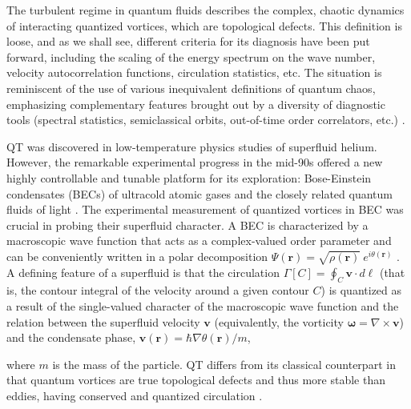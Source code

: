 \documentclass[aps,prl,twocolumn,showpacs,notitlepage,floatfix,superscriptaddress]{revtex4-1}
\begin{document}
The turbulent regime in quantum fluids describes the complex, chaotic dynamics of interacting quantized vortices, which are topological defects. This definition is loose, and as we shall see, different criteria for its diagnosis have been put forward, including the scaling of the energy spectrum on the wave number, velocity autocorrelation functions, circulation statistics, etc. The situation is reminiscent of the use of various inequivalent definitions of quantum chaos, emphasizing complementary features brought out by a diversity of diagnostic tools (spectral statistics, semiclassical orbits, out-of-time order correlators, etc.) \cite{Nandy25}.

QT was discovered in low-temperature physics studies of superfluid helium. However, the remarkable experimental progress in the mid-90s offered a new highly controllable and tunable platform for its exploration: Bose-Einstein condensates (BECs) of ultracold atomic gases \cite{Ueda10} and the closely related quantum fluids of light \cite{Carusotto13}. The experimental measurement of quantized vortices in BEC was crucial in probing their superfluid character.
A BEC is characterized
by a macroscopic wave function that acts as a complex-valued order parameter
and can be conveniently written in a polar decomposition $\Psi(\boldsymbol{r})=\sqrt{
\rho \left( \boldsymbol{r} \right)
}\ e^{i\theta(\boldsymbol{r})}$ \cite{pitaevskii2003bose}. A defining feature of a superfluid is that the circulation $\Gamma[C]=\oint_C \boldsymbol{v}\cdot d\boldsymbol{\ell}$ (that is, the contour integral of the velocity around a given contour $C$) is quantized as a result of the single-valued character of the macroscopic wave function and the relation between the superfluid velocity $\boldsymbol{v}$ (equivalently, the vorticity $\boldsymbol{\omega}=\nabla\times\boldsymbol{v}$) and the condensate phase, $\boldsymbol{v}(\boldsymbol{r})=\hbar\nabla\theta(\boldsymbol{r})/m$,

where $m$ is the mass of the particle.
QT differs from its classical counterpart in that quantum vortices are true topological defects and thus more stable than eddies, having conserved and quantized circulation \cite{Tsubota13,Tsatsos16}.
\end{document}

